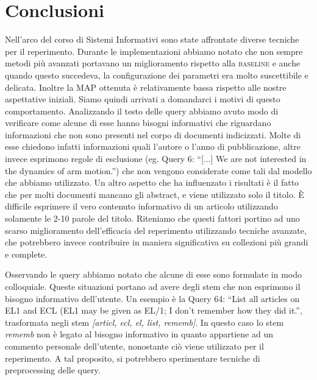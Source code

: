 \documentclass{llncs}
\begin{document}






\section{Conclusioni}
\label{sec:conclusioni}
Nell'arco del corso di Sistemi Informativi sono state affrontate diverse tecniche per il reperimento. Durante le implementazioni abbiamo notato che non sempre metodi pi\`u avanzati portavano un miglioramento rispetto alla \textsc{baseline} e anche quando questo succedeva, la configurazione dei parametri era molto suscettibile e delicata. Inoltre la MAP ottenuta \`e relativamente bassa rispetto alle nostre aspettative iniziali. Siamo quindi arrivati a domandarci i motivi di questo comportamento. Analizzando il testo delle query abbiamo avuto modo di verificare come alcune di esse hanno bisogni informativi che riguardano informazioni che non sono presenti nel corpo di documenti indicizzati. Molte di esse chiedono infatti informazioni quali l'autore o l'anno di pubblicazione, altre invece esprimono regole di esclusione (eg. Query 6: ``[...] We are not interested in the dynamics of arm motion.'') che non vengono considerate come tali dal modello che abbiamo utilizzato. Un altro aspetto che ha influenzato i risultati \`e il fatto che per molti documenti mancano gli abstract, e viene utilizzato solo il titolo. \`E difficile esprimere il vero contenuto informativo di un articolo utilizzando solamente le 2-10 parole del titolo. Riteniamo che questi fattori portino ad uno scarso miglioramento dell'efficacia del reperimento utilizzando tecniche avanzate, che potrebbero invece contribuire in maniera significativa su collezioni pi\`u grandi e complete. 

Osservando le query abbiamo notato che alcune di esse sono formulate in modo colloquiale. Queste situazioni portano ad avere degli stem che non esprimono il bisogno informativo dell'utente. Un esempio \`e la Query 64: ``List all articles on EL1 and ECL (EL1 may be given as EL/1; I don't remember how they did it.'', trasformata negli stem \textit{[articl, ecl, el, list, rememb]}. In questo caso lo stem \textit{rememb} non \`e legato al bisogno informativo in quanto appartiene ad un commento personale dell'utente, nonostante ci\`o viene utilizzato per il reperimento. A tal proposito, si potrebbero sperimentare tecniche di preprocessing delle query.
\end{document}
